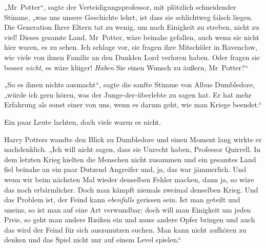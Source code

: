 „Mr~Potter“, sagte der Verteidigungsprofessor, mit plötzlich schneidender Stimme, „was uns unsere Geschichte lehrt, ist dass sie schlichtweg falsch liegen. Die Generation Ihrer Eltern tat zu wenig, um nach Einigkeit zu streben, nicht zu viel! Dieses gesamte Land, Mr~Potter, wäre beinahe gefallen, auch wenn sie nicht hier waren, es zu sehen. Ich schlage vor, sie fragen ihre Mitschüler in Ravenclaw, wie viele von ihnen Familie an den Dunklen Lord verloren haben. Oder fragen sie besser \emph{nicht}, es wäre klüger! \emph{Haben} Sie einen Wunsch zu äußern, Mr~Potter?“

„So es ihnen nichts ausmacht“, sagte die sanfte Stimme von Albus Dumbledore, „würde ich gern hören, was der Junge-der-überlebte zu sagen hat. Er hat mehr Erfahrung als sonst einer von uns, wenn es darum geht, wie man Kriege beendet.“

Ein paar Leute lachten, doch viele waren es nicht.

Harry Potters wandte den Blick zu Dumbledore und einen Moment lang wirkte er nachdenklich.
„Ich will nicht sagen, dass sie Unrecht haben, Professor Quirrell. In dem letzten Krieg hielten die Menschen nicht zusammen und ein gesamtes Land fiel beinahe an ein paar Dutzend Angreifer und, ja, das war jämmerlich. Und wenn wir beim nächsten Mal wieder denselben Fehler machen, dann ja, so wäre das noch erbärmlicher. Doch man kämpft niemals zweimal denselben Krieg. Und das Problem ist, der Feind kann \emph{ebenfalls} gerissen sein. Ist man geteilt und uneins, so ist man auf eine Art verwundbar; doch will man Einigkeit um jeden Preis, so geht man andere Risiken ein und muss andere Opfer bringen und auch das wird der Feind für sich auszunutzen suchen. Man kann nicht aufhören zu denken und das Spiel nicht nur auf einem Level spielen.“

